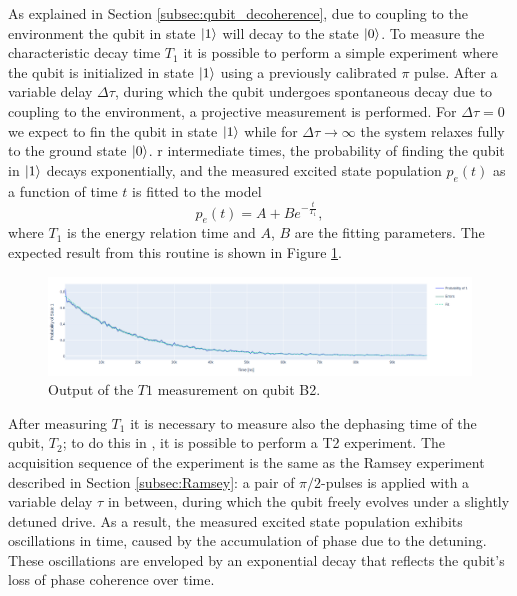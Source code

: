 As explained in Section \ref{subsec:qubit_decoherence}, due to coupling to the environment the qubit in state $\ket{1}$ will decay to the state $\ket{0}$. 
To measure the characteristic decay time $T_1$ it is possible to perform a simple experiment where the qubit is initialized in state $\ket{1}$ using a previously calibrated $\pi$ pulse.
After a variable delay $\Delta\tau$, during which the qubit undergoes spontaneous decay due to coupling to the environment, a projective measurement is performed.
For $\Delta\tau = 0$ we expect to fin the qubit in state $\ket{1}$ while for $\Delta\tau \rightarrow \infty$ the system relaxes fully to the ground state $\ket{0}$.
r intermediate times, the probability of finding the qubit in $\ket{1}$ decays exponentially, and the measured excited state population $p_e(t)$ as a function of time $t$ is fitted to the model 
\begin{equation}\label{eq:T1}
    p_e(t) = A + Be^{-\frac{t}{T_1}},
\end{equation}
where $T_1$ is the energy relation time and $A$, $B$ are the fitting parameters.
The expected result from this routine is shown in Figure \ref{fig:t1}.

\begin{figure}[h!]
    \centering
    \includegraphics[width=\textwidth]{figures/png/t1.png}
    \caption{Output of the $T1$ measurement on qubit B2.}
    \label{fig:t1}
\end{figure}

After measuring $T_1$ it is necessary to measure also the dephasing time of the qubit, $T_2$; to do this in \Qibocal, it is possible to perform a T2 experiment.
The acquisition sequence of the experiment is the same as the Ramsey experiment described in Section \ref{subsec:Ramsey}: a pair of $\pi/2$-pulses is applied with a variable delay $\tau$ in between, during which the qubit freely evolves under a slightly detuned drive.
As a result, the measured excited state population exhibits oscillations in time, caused by the accumulation of phase due to the detuning. 
These oscillations are enveloped by an exponential decay that reflects the qubit's loss of phase coherence over time.  

